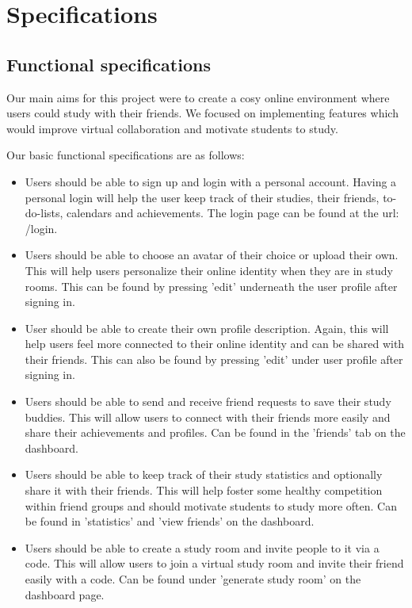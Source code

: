 \chapter{Specifications}
\label{chap:specifications}
\section{Functional specifications}
\label{sect:functional-specifications}

Our main aims for this project were to create a cosy online environment where users could study with their friends. We focused on implementing features which would improve virtual collaboration and motivate students to study.

Our basic functional specifications are as follows:

\begin{itemize}
\item Users should be able to sign up and login with a personal account. Having a personal login will help the user keep track of their studies, their friends, to-do-lists, calendars and achievements. The login page can be found at the url: /login.
\item Users should be able to choose an avatar of their choice or upload their own. This will help users personalize their online identity when they are in study rooms. This can be found by pressing 'edit' underneath the user profile after signing in.
\item User should be able to create their own profile description. Again, this will help users feel more connected to their online identity and can be shared with their friends. This can also be found by pressing 'edit' under user profile after signing in.
\item Users should be able to send and receive friend requests to save their study buddies. This will allow users to connect with their friends more easily and share their achievements and profiles. Can be found in the 'friends' tab on the dashboard.
\item Users should be able to keep track of their study statistics and optionally share it with their friends. This will help foster some healthy competition within friend groups and should motivate students to study more often. Can be found in 'statistics' and 'view friends' on the dashboard.
\item Users should be able to create a study room and invite people to it via a code. This will allow users to join a virtual study room and invite their friend easily with a code. Can be found under 'generate study room' on the dashboard page.

\end{itemize}
